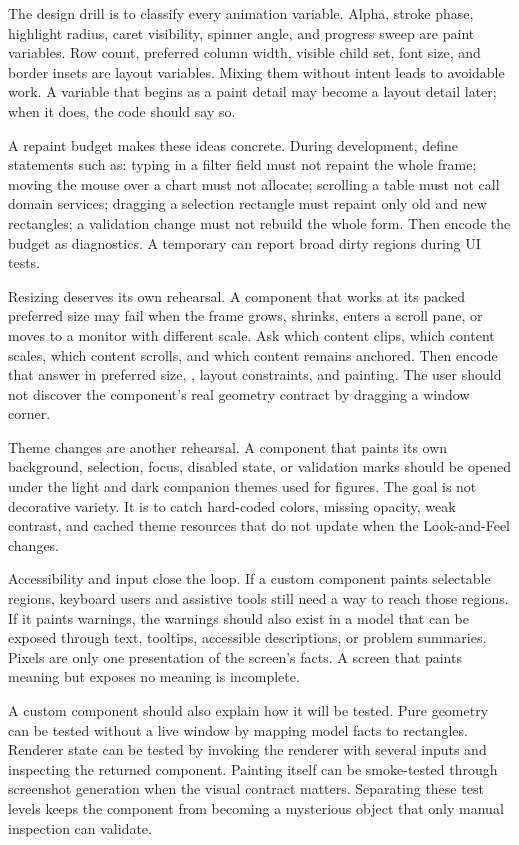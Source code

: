 The design drill is to classify every animation variable. Alpha, stroke phase, highlight radius, caret visibility, spinner angle, and progress sweep are paint variables. Row count, preferred column width, visible child set, font size, and border insets are layout variables. Mixing them without intent leads to avoidable work. A variable that begins as a paint detail may become a layout detail later; when it does, the code should say so.

A repaint budget makes these ideas concrete. During development, define statements such as: typing in a filter field must not repaint the whole frame; moving the mouse over a chart must not allocate; scrolling a table must not call domain services; dragging a selection rectangle must repaint only old and new rectangles; a validation change must not rebuild the whole form. Then encode the budget as diagnostics. A temporary  can report broad dirty regions during UI tests.

Resizing deserves its own rehearsal. A component that works at its packed preferred size may fail when the frame grows, shrinks, enters a scroll pane, or moves to a monitor with different scale. Ask which content clips, which content scales, which content scrolls, and which content remains anchored. Then encode that answer in preferred size, , layout constraints, and painting. The user should not discover the component's real geometry contract by dragging a window corner.

Theme changes are another rehearsal. A component that paints its own background, selection, focus, disabled state, or validation marks should be opened under the light and dark companion themes used for figures. The goal is not decorative variety. It is to catch hard-coded colors, missing opacity, weak contrast, and cached theme resources that do not update when the Look-and-Feel changes.

Accessibility and input close the loop. If a custom component paints selectable regions, keyboard users and assistive tools still need a way to reach those regions. If it paints warnings, the warnings should also exist in a model that can be exposed through text, tooltips, accessible descriptions, or problem summaries. Pixels are only one presentation of the screen's facts. A screen that paints meaning but exposes no meaning is incomplete.

A custom component should also explain how it will be tested. Pure geometry can be tested without a live window by mapping model facts to rectangles. Renderer state can be tested by invoking the renderer with several inputs and inspecting the returned component. Painting itself can be smoke-tested through screenshot generation when the visual contract matters. Separating these test levels keeps the component from becoming a mysterious object that only manual inspection can validate.

